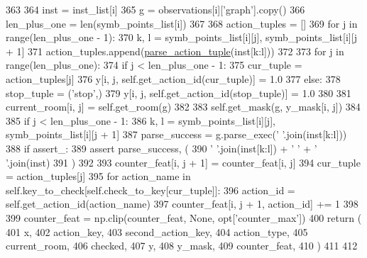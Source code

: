 \begin{DoxyCode}
363 
364             inst = inst\_list[i]
365             g = observations[i][\textcolor{stringliteral}{'graph'}].copy()
366             len\_plus\_one = len(symb\_points\_list[i])
367 
368             action\_tuples = []
369             \textcolor{keywordflow}{for} j \textcolor{keywordflow}{in} range(len\_plus\_one - 1):
370                 k, l = symb\_points\_list[i][j], symb\_points\_list[i][j + 1]
371                 action\_tuples.append(\hyperlink{namespaceprojects_1_1mastering__the__dungeon_1_1agents_1_1graph__world2_1_1agents_a11c98f469df4fb4ecb640c91544dfe26}{parse\_action\_tuple}(inst[k:l]))
372 
373             \textcolor{keywordflow}{for} j \textcolor{keywordflow}{in} range(len\_plus\_one):
374                 \textcolor{keywordflow}{if} j < len\_plus\_one - 1:
375                     cur\_tuple = action\_tuples[j]
376                     y[i, j, self.get\_action\_id(cur\_tuple)] = 1.0
377                 \textcolor{keywordflow}{else}:
378                     stop\_tuple = (\textcolor{stringliteral}{'stop'},)
379                     y[i, j, self.get\_action\_id(stop\_tuple)] = 1.0
380 
381                 current\_room[i, j] = self.get\_room(g)
382 
383                 self.get\_mask(g, y\_mask[i, j])
384 
385                 \textcolor{keywordflow}{if} j < len\_plus\_one - 1:
386                     k, l = symb\_points\_list[i][j], symb\_points\_list[i][j + 1]
387                     parse\_success = g.parse\_exec(\textcolor{stringliteral}{' '}.join(inst[k:l]))
388                     \textcolor{keywordflow}{if} assert\_:
389                         \textcolor{keyword}{assert} parse\_success, (
390                             \textcolor{stringliteral}{' '}.join(inst[k:l]) + \textcolor{stringliteral}{'  '} + \textcolor{stringliteral}{' '}.join(inst)
391                         )
392 
393                     counter\_feat[i, j + 1] = counter\_feat[i, j]
394                     cur\_tuple = action\_tuples[j]
395                     \textcolor{keywordflow}{for} action\_name \textcolor{keywordflow}{in} self.key\_to\_check[self.check\_to\_key[cur\_tuple]]:
396                         action\_id = self.get\_action\_id(action\_name)
397                         counter\_feat[i, j + 1, action\_id] += 1
398 
399         counter\_feat = np.clip(counter\_feat, \textcolor{keywordtype}{None}, opt[\textcolor{stringliteral}{'counter\_max'}])
400         \textcolor{keywordflow}{return} (
401             x,
402             action\_key,
403             second\_action\_key,
404             action\_type,
405             current\_room,
406             checked,
407             y,
408             y\_mask,
409             counter\_feat,
410         )
411 
412 
\end{DoxyCode}
